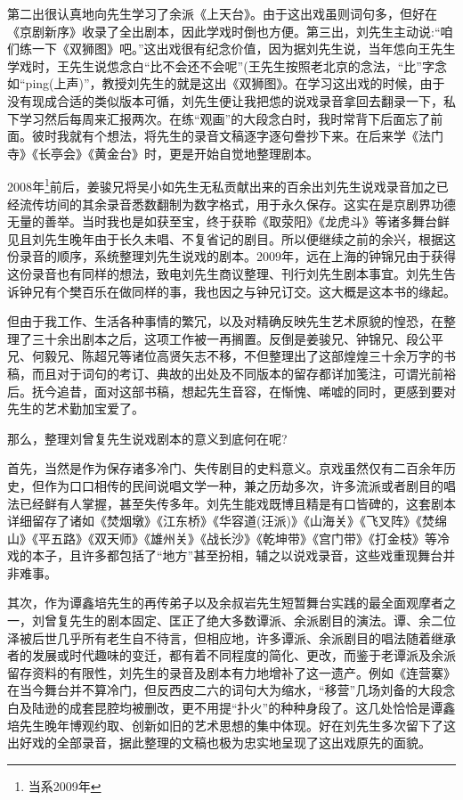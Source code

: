 第二出很认真地向先生学习了余派《上天台》。由于这出戏虽则词句多，但好在《京剧新序》收录了全出剧本，因此学戏时倒也方便。第三出，刘先生主动说:``咱们练一下《双狮图》吧。''这出戏很有纪念价值，因为据刘先生说，当年怹向王先生学戏时，王先生说怹念白``比不会还不会呢''(王先生按照老北京的念法，``比''字念如``ping(上声)''，教授刘先生的就是这出《双狮图》。在学习这出戏的时候，由于没有现成合适的类似版本可循，刘先生便让我把怹的说戏录音拿回去翻录一下，私下学习然后每周来汇报两次。在练``观画''的大段念白时，我时常背下后面忘了前面。彼时我就有个想法，将先生的录音文稿逐字逐句誊抄下来。在后来学《法门寺》《长亭会》《黄金台》时，更是开始自觉地整理剧本。

\textrm{2008}年\footnote{当系\textrm{2009}年}前后，姜骏兄将吴小如先生无私贡献出来的百余出刘先生说戏录音加之已经流传坊间的其余录音悉数翻制为数字格式，用于永久保存。这实在是京剧界功德无量的善举。当时我也是如获至宝，终于获聆《取荥阳》《龙虎斗》等诸多舞台鲜见且刘先生晚年由于长久未唱、不复省记的剧目。所以便继续之前的余兴，根据这份录音的顺序，系统整理刘先生说戏的剧本。\textrm{2009}年，远在上海的钟锦兄由于获得这份录音也有同样的想法，致电刘先生商议整理、刊行刘先生剧本事宜。刘先生告诉钟兄有个樊百乐在做同样的事，我也因之与钟兄订交。这大概是这本书的缘起。

但由于我工作、生活各种事情的繁冗，以及对精确反映先生艺术原貌的惶恐，在整理了三十余出剧本之后，这项工作被一再搁置。反倒是姜骏兄、钟锦兄、段公平兄、何毅兄、陈超兄等诸位高贤矢志不移，不但整理出了这部煌煌三十余万字的书稿，而且对于词句的考订、典故的出处及不同版本的留存都详加笺注，可谓光前裕后。抚今追昔，面对这部书稿，想起先生音容，在惭愧、唏嘘的同时，更感到要对先生的艺术勤加宝爱了。

那么，整理刘曾复先生说戏剧本的意义到底何在呢?

首先，当然是作为保存诸多冷门、失传剧目的史料意义。京戏虽然仅有二百余年历史，但作为口口相传的民间说唱文学一种，兼之历劫多次，许多流派或者剧目的唱法已经鲜有人掌握，甚至失传多年。刘先生能戏既博且精是有口皆碑的，这套剧本详细留存了诸如《焚烟墩》《江东桥》《华容道(汪派)》《山海关》《飞叉阵》《焚绵山》《平五路》《双天师》《雄州关》《战长沙》《乾坤带》《宫门带》《打金枝》等冷戏的本子，且许多都包括了``地方''甚至扮相，辅之以说戏录音，这些戏重现舞台并非难事。

其次，作为谭鑫培先生的再传弟子以及余叔岩先生短暂舞台实践的最全面观摩者之一，刘曾复先生的剧本固定、匡正了绝大多数谭派、余派剧目的演法。谭、余二位泽被后世几乎所有老生自不待言，但相应地，许多谭派、余派剧目的唱法随着继承者的发展或时代趣味的变迁，都有着不同程度的简化、更改，而鉴于老谭派及余派留存资料的有限性，刘先生的录音及剧本有力地增补了这一遗产。例如《连营寨》在当今舞台并不算冷门，但反西皮二六的词句大为缩水，``移营''几场刘备的大段念白及陆逊的成套昆腔均被删改，更不用提``扑火''的种种身段了。这几处恰恰是谭鑫培先生晚年博观约取、创新如旧的艺术思想的集中体现。好在刘先生多次留下了这出好戏的全部录音，据此整理的文稿也极为忠实地呈现了这出戏原先的面貌。

